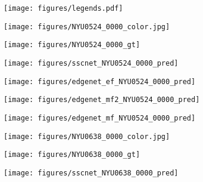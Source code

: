 \begin{figure*}[ht]
\centering  


\begin{subfigure}{.8\textwidth}
\texttt{[image: figures/legends.pdf]}

\end{subfigure}

\bigskip



\begin{subfigure}{0.16\textwidth}
\texttt{[image: figures/NYU0524\_0000\_color.jpg]}

\end{subfigure}
\begin{subfigure}{0.16\textwidth}
\texttt{[image: figures/NYU0524\_0000\_gt]}
\end{subfigure}
\begin{subfigure}{0.16\textwidth}
\texttt{[image: figures/sscnet\_NYU0524\_0000\_pred]}

\end{subfigure}
\begin{subfigure}{0.16\textwidth}
\texttt{[image: figures/edgenet\_ef\_NYU0524\_0000\_pred]}

\end{subfigure}
\begin{subfigure}{0.16\textwidth}
\texttt{[image: figures/edgenet\_mf2\_NYU0524\_0000\_pred]}

\end{subfigure}
\begin{subfigure}{0.16\textwidth}
\texttt{[image: figures/edgenet\_mf\_NYU0524\_0000\_pred]}

\end{subfigure}



\begin{subfigure}{0.16\textwidth}
\texttt{[image: figures/NYU0638\_0000\_color.jpg]}

\end{subfigure}
\begin{subfigure}{0.16\textwidth}
\texttt{[image: figures/NYU0638\_0000\_gt]}
\end{subfigure}
\begin{subfigure}{0.16\textwidth}
\texttt{[image: figures/sscnet\_NYU0638\_0000\_pred]}


\end{subfigure}
\end{figure*}
